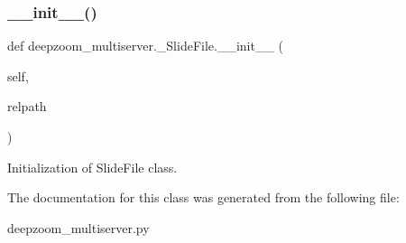 \subsubsection{\texorpdfstring{\+\_\+\+\_\+init\+\_\+\+\_\+()}{\_\_init\_\_()}}
{\footnotesize\ttfamily def deepzoom\+\_\+multiserver.\+\_\+\+Slide\+File.\+\_\+\+\_\+init\+\_\+\+\_\+ (\begin{DoxyParamCaption}\item[{}]{self,  }\item[{}]{relpath }\end{DoxyParamCaption})}

\begin{DoxyVerb}Initialization of SlideFile class.
\end{DoxyVerb}
 

The documentation for this class was generated from the following file\+:\begin{DoxyCompactItemize}
\item 
deepzoom\+\_\+multiserver.\+py\end{DoxyCompactItemize}
